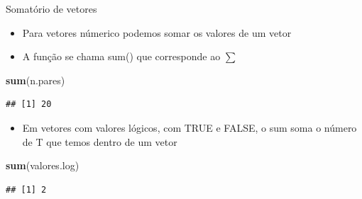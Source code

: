 \documentclass[
  10pt,
  ignorenonframetext,
]{beamer}
\newenvironment{Shaded}{\begin{snugshade}}{\end{snugshade}}
\newcommand{\KeywordTok}[1]{\textcolor[rgb]{0.13,0.29,0.53}{\textbf{#1}}}
\newcommand{\NormalTok}[1]{#1}
\providecommand{\tightlist}{%
  \setlength{\itemsep}{0pt}\setlength{\parskip}{0pt}}
\begin{document}
\begin{frame}[fragile]{Somatório de vetores}
\protect\hypertarget{somatuxf3rio-de-vetores}{}
\begin{itemize}
\tightlist
\item
  Para vetores númerico podemos somar os valores de um vetor
\item
  A função se chama sum() que corresponde ao \(\sum\)
\end{itemize}

\begin{Shaded}
\begin{Highlighting}[]
\KeywordTok{sum}\NormalTok{(n.pares)}
\end{Highlighting}
\end{Shaded}

\begin{verbatim}
## [1] 20
\end{verbatim}

\begin{itemize}
\tightlist
\item
  Em vetores com valores lógicos, com TRUE e FALSE, o sum soma o número
  de T que temos dentro de um vetor
\end{itemize}

\begin{Shaded}
\begin{Highlighting}[]
\KeywordTok{sum}\NormalTok{(valores.log)}
\end{Highlighting}
\end{Shaded}

\begin{verbatim}
## [1] 2
\end{verbatim}
\end{frame}
\end{document}
